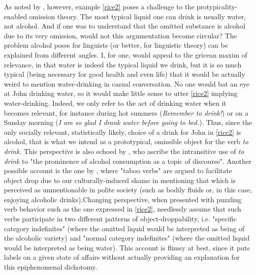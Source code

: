 As noted by \textcite[125]{Naess2007}, however, example \ref{rice2} poses a challenge to the protypicality-enabled omission theory. The most typical liquid one can drink is usually water, not alcohol. And if one was to understand that the omitted substance is alcohol due to its very omission, would not this argumentation become circular? The problem alcohol poses for linguists (or better, for linguistic theory) can be explained from different angles. I, for one, would appeal to the gricean maxim of relevance, in that water is indeed the typical liquid we drink, but it is so much typical (being necessary for good health and even life) that it would be actually weird to mention water-drinking in casual conversation. No one would bat an eye at John drinking water, so it would make little sense to utter \ref{rice2} implying water-drinking. Indeed, we only refer to the act of drinking water when it becomes relevant, for instance during hot summers (\textit{Remember to drink!}) or on a Sunday morning (\textit{I am so glad I drank water before going to bed.}). Thus, since the only socially relevant, statistically likely, choice of a drink for John in \ref{rice2} is alcohol, that is what we intend as a prototypical, omissible object for the verb \textit{to drink}. This perspective is also echoed by \textcite[14]{NewmanRice2006}, who ascribe the intransitive use of \textit{to drink} to "the prominence of alcohol consumption as a topic of discourse". Another possible account is the one by \textcite[21-28]{Goldberg2005}, where "taboo verbs" are argued to facilitate object drop due to our culturally-induced shame in mentioning that which is perceived as unmentionable in polite society (such as bodily fluids or, in this case, enjoying alcoholic drinks).Changing perspective, when presented with puzzling verb behavior such as the one expressed in \ref{rice2}, \textcite[303-305]{HuddlestonEtAl2002} needlessly assume that such verbs participate in two different patterns of object-droppability, i.e. "specific category indefinites" (where the omitted liquid would be interpreted as being of the alcoholic variety) and "normal category indefinites" (where the omitted liquid would be interpreted as being water). This account is flimsy at best, since it puts labels on a given state of affairs without actually providing an explanation for this epiphenomenal dichotomy.\\
